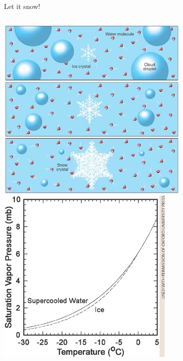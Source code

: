\documentclass[xcolor=table]{beamer}
\begin{document}
\begin{frame}{Let it snow!}
\begin{columns}[b]
	\vspace{1em}\includegraphics[width=\textwidth]{bergeron.jpg}
	\includegraphics[width=\textwidth,clip=true,trim=0 0 0.8mm 0]{queries-figure-1.jpg}
	

\end{columns}
\end{frame}
\end{document}
